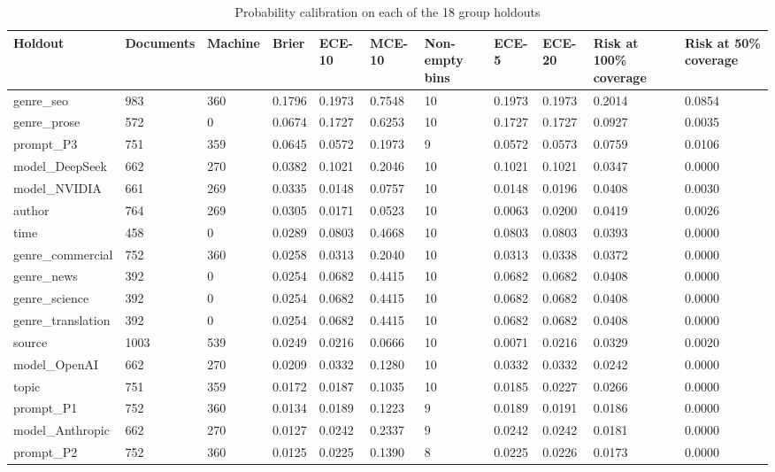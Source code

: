 \begin{table}
\centering
\scriptsize
\caption{Probability calibration on each of the 18 group holdouts}
\label{tab:s6}
\begin{tabular}{lllllllllll}
\toprule
Holdout & Documents & Machine & Brier & ECE-10 & MCE-10 & Non-empty bins & ECE-5 & ECE-20 & Risk at 100\% coverage & Risk at 50\% coverage \\
\midrule
genre\_seo & 983 & 360 & 0.1796 & 0.1973 & 0.7548 & 10 & 0.1973 & 0.1973 & 0.2014 & 0.0854 \\
genre\_prose & 572 & 0 & 0.0674 & 0.1727 & 0.6253 & 10 & 0.1727 & 0.1727 & 0.0927 & 0.0035 \\
prompt\_P3 & 751 & 359 & 0.0645 & 0.0572 & 0.1973 & 9 & 0.0572 & 0.0573 & 0.0759 & 0.0106 \\
model\_DeepSeek & 662 & 270 & 0.0382 & 0.1021 & 0.2046 & 10 & 0.1021 & 0.1021 & 0.0347 & 0.0000 \\
model\_NVIDIA & 661 & 269 & 0.0335 & 0.0148 & 0.0757 & 10 & 0.0148 & 0.0196 & 0.0408 & 0.0030 \\
author & 764 & 269 & 0.0305 & 0.0171 & 0.0523 & 10 & 0.0063 & 0.0200 & 0.0419 & 0.0026 \\
time & 458 & 0 & 0.0289 & 0.0803 & 0.4668 & 10 & 0.0803 & 0.0803 & 0.0393 & 0.0000 \\
genre\_commercial & 752 & 360 & 0.0258 & 0.0313 & 0.2040 & 10 & 0.0313 & 0.0338 & 0.0372 & 0.0000 \\
genre\_news & 392 & 0 & 0.0254 & 0.0682 & 0.4415 & 10 & 0.0682 & 0.0682 & 0.0408 & 0.0000 \\
genre\_science & 392 & 0 & 0.0254 & 0.0682 & 0.4415 & 10 & 0.0682 & 0.0682 & 0.0408 & 0.0000 \\
genre\_translation & 392 & 0 & 0.0254 & 0.0682 & 0.4415 & 10 & 0.0682 & 0.0682 & 0.0408 & 0.0000 \\
source & 1003 & 539 & 0.0249 & 0.0216 & 0.0666 & 10 & 0.0071 & 0.0216 & 0.0329 & 0.0020 \\
model\_OpenAI & 662 & 270 & 0.0209 & 0.0332 & 0.1280 & 10 & 0.0332 & 0.0332 & 0.0242 & 0.0000 \\
topic & 751 & 359 & 0.0172 & 0.0187 & 0.1035 & 10 & 0.0185 & 0.0227 & 0.0266 & 0.0000 \\
prompt\_P1 & 752 & 360 & 0.0134 & 0.0189 & 0.1223 & 9 & 0.0189 & 0.0191 & 0.0186 & 0.0000 \\
model\_Anthropic & 662 & 270 & 0.0127 & 0.0242 & 0.2337 & 9 & 0.0242 & 0.0242 & 0.0181 & 0.0000 \\
prompt\_P2 & 752 & 360 & 0.0125 & 0.0225 & 0.1390 & 8 & 0.0225 & 0.0226 & 0.0173 & 0.0000 \\

\end{tabular}
\end{table}
